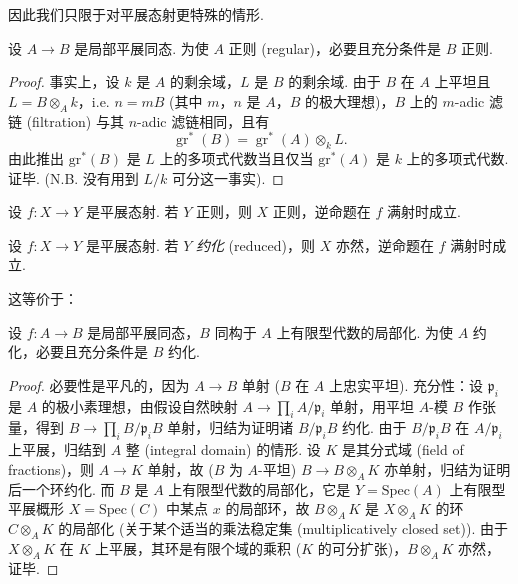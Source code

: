 因此我们只限于对平展态射更特殊的情形.

\begin{proposition}\label{prop:I.9.1}
设 $A \to B$ 是局部平展同态. 为使 $A$ 正则 (regular)，必要且充分条件是 $B$ 正则.
\end{proposition}

\begin{proof}
事实上，设 $k$ 是 $A$ 的剩余域，$L$ 是 $B$ 的剩余域. 由于 $B$ 在 $A$ 上平坦且 $L = B \otimes_A k$，i.e. $n = mB$ (其中 $m$，$n$ 是 $A$，$B$ 的极大理想)，$B$ 上的 $m$-adic 滤链 (filtration) 与其 $n$-adic 滤链相同，且有
\[
\operatorname{gr}^{*}(B) = \operatorname{gr}^{*}(A) \otimes_k L.
\]
由此推出 $\mathrm{gr}^{*}(B)$ 是 $L$ 上的多项式代数当且仅当 $\mathrm{gr}^{*}(A)$ 是 $k$ 上的多项式代数. 证毕. (N.B. 没有用到 $L/k$ 可分这一事实).
\end{proof}

\begin{corollary}\label{cor:I.9.2}
设 $f \colon X \to Y$ 是平展态射. 若 $Y$ 正则，则 $X$ 正则，逆命题在 $f$ 满射时成立.
\end{corollary}

\begingroup
\addtocounter{theorem}{-1}%
\renewcommand{\thetheorem}{\thesection.2}%
\begin{proposition}\label{prop:I.9.2red}
设 $f \colon X \to Y$ 是平展态射. 若 $Y$ \emph{约化} (reduced)，则 $X$ 亦然，逆命题在 $f$ 满射时成立.
\end{proposition}

\endgroup

这等价于：

\begin{corollary}\label{cor:I.9.3}
设 $f \colon A \to B$ 是局部平展同态，$B$ 同构于 $A$ 上有限型代数的局部化. 为使 $A$ 约化，必要且充分条件是 $B$ 约化.
\end{corollary}

\begin{proof}
必要性是平凡的，因为 $A \to B$ 单射 ($B$ 在 $A$ 上忠实平坦). 充分性：设 $\mathfrak{p}_i$ 是 $A$ 的极小素理想，由假设自然映射 $A \to \prod_i A/\mathfrak{p}_i$ 单射，用平坦 $A$-模 $B$ 作张量，得到 $B \to \prod_i B/\mathfrak{p}_i B$ 单射，归结为证明诸 $B/\mathfrak{p}_i B$ 约化. 由于 $B/\mathfrak{p}_i B$ 在 $A/\mathfrak{p}_i$ 上平展，归结到 $A$ 整 (integral domain) 的情形. 设 $K$ 是其分式域 (field of fractions)，则 $A \to K$ 单射，故 ($B$ 为 $A$-平坦) $B \to B \otimes_A K$ 亦单射，归结为证明后一个环约化. 而 $B$ 是 $A$ 上有限型代数的局部化，它是 $Y = \mathrm{Spec}(A)$ 上有限型平展概形 $X = \mathrm{Spec}(C)$ 中某点 $x$ 的局部环，故 $B \otimes_A K$ 是 $X \otimes_A K$ 的环 $C \otimes_A K$ 的局部化 (关于某个适当的乘法稳定集 (multiplicatively closed set)). 由于 $X \otimes_A K$ 在 $K$ 上平展，其环是有限个域的乘积 ($K$ 的可分扩张)，$B \otimes_A K$ 亦然，证毕.
\end{proof}

